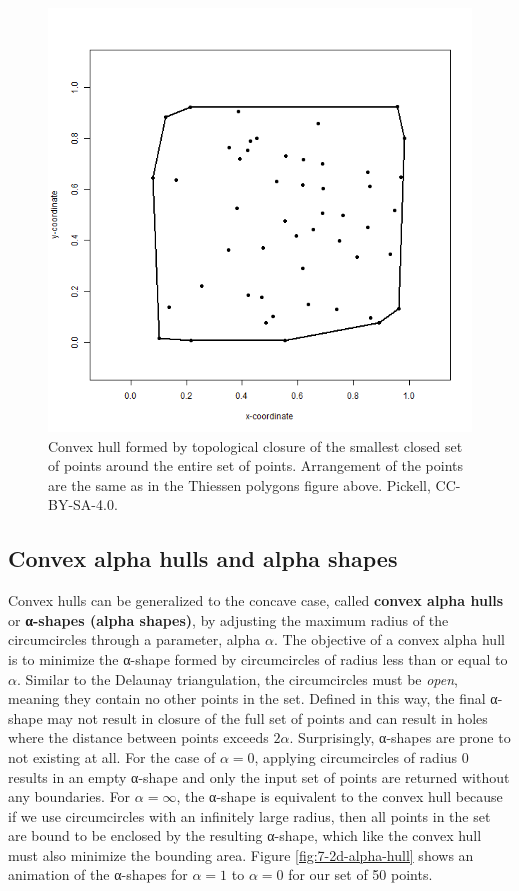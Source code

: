 \documentclass[
]{book}
\begin{document}
\begin{figure}
\includegraphics[width=0.75\linewidth]{images/07-2d-convex-hull} \caption{Convex hull formed by topological closure of the smallest closed set of points around the entire set of points. Arrangement of the points are the same as in the Thiessen polygons figure above. Pickell, CC-BY-SA-4.0.}\label{fig:7-2d-convex-hull}
\end{figure}

\subsection{Convex alpha hulls and alpha shapes}\label{convex-alpha-hulls-and-alpha-shapes}

Convex hulls can be generalized to the concave case, called \textbf{convex alpha hulls} or \textbf{α-shapes (alpha shapes)}, by adjusting the maximum radius of the circumcircles through a parameter, alpha \(α\). The objective of a convex alpha hull is to minimize the α-shape formed by circumcircles of radius less than or equal to \(α\). Similar to the Delaunay triangulation, the circumcircles must be \emph{open}, meaning they contain no other points in the set. Defined in this way, the final α-shape may not result in closure of the full set of points and can result in holes where the distance between points exceeds \(2α\). Surprisingly, α-shapes are prone to not existing at all. For the case of \(α=0\), applying circumcircles of radius 0 results in an empty α-shape and only the input set of points are returned without any boundaries. For \(α=∞\), the α-shape is equivalent to the convex hull because if we use circumcircles with an infinitely large radius, then all points in the set are bound to be enclosed by the resulting α-shape, which like the convex hull must also minimize the bounding area. Figure \ref{fig:7-2d-alpha-hull} shows an animation of the α-shapes for \(α=1\) to \(α=0\) for our set of 50 points.
\end{document}

